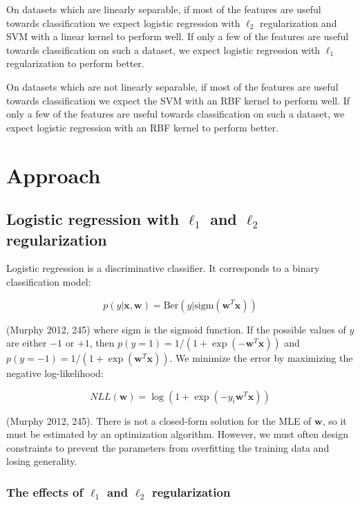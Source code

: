 \documentclass[letterpaper, 11pt]{article}
\newcommand{\vect}[1]{\boldsymbol{#1}}
\begin{document}
On datasets which are linearly separable, if most of the features are useful towards classification we expect logistic regression with $\ell_2$ regularization and SVM with a linear kernel to perform well. If only a few of the features are useful towards classification on such a dataset, we expect logistic regression with $\ell_1$ regularization to perform better.

On datasets which are not linearly separable, if most of the features are useful towards classification we expect the SVM with an RBF kernel to perform well. If only a few of the features are useful towards classification on such a dataset, we expect logistic regression with an RBF kernel to perform better.

\section{Approach}

\subsection{Logistic regression with $\ell_1$ and $\ell_2$ regularization}

Logistic regression is a discriminative classifier. It corresponds to a binary classification model:

\begin{equation*}
  p(y | \vect{x}, \vect{w}) = \text{Ber}(y | \text{sigm}(\vect{w}^T\vect{x}))
\end{equation*}

(Murphy 2012, 245) where sigm is the sigmoid function. If the possible values of $y$ are either $-1$ or $+1$, then $p(y = 1) = 1 / (1 + \exp(-\vect{w}^T\vect{x}))$ and $p(y = -1) = 1 / (1 + \exp(\vect{w}^T\vect{x}))$. We minimize the error by maximizing the negative log-likelihood:

\begin{equation*}
  NLL(\vect{w}) = \log(1 + \exp(-y_i \vect{w}^T\vect{x}))
\end{equation*}

(Murphy 2012, 245). There is not a closed-form solution for the MLE of $\vect{w}$, so it must be estimated by an optimization algorithm. However, we must often design constraints to prevent the parameters from overfitting the training data and losing generality.

\subsubsection{The effects of $\ell_1$ and $\ell_2$ regularization}
\end{document}
